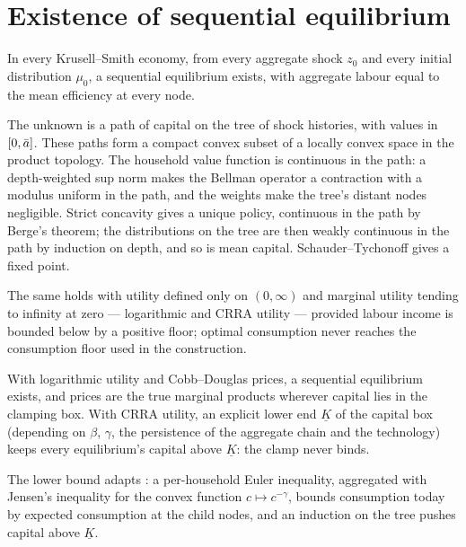 \section{Existence of sequential equilibrium}\label{sec:existence}

\begin{theorem}\label{thm:existence}
In every Krusell--Smith economy, from every aggregate shock $z_0$ and every initial distribution
$\mu_0$, a sequential equilibrium exists, with aggregate labour equal to the mean efficiency at
every node.
\end{theorem}

\noindent
The unknown is a path of capital on the tree of shock histories, with values in $[0,\bar a]$. These
paths form a compact convex subset of a locally convex space in the product topology. The household
value function is continuous in the path: a depth-weighted sup norm makes the Bellman operator a
contraction with a modulus uniform in the path, and the weights make the tree's distant nodes
negligible. Strict concavity gives a unique policy, continuous in the path by Berge's theorem; the
distributions on the tree are then weakly continuous in the path by induction on depth, and so is
mean capital. Schauder--Tychonoff gives a fixed point.

\begin{theorem}\label{thm:existenceInada}
The same holds with utility defined only on $(0,\infty)$ and marginal utility tending to infinity at
zero --- logarithmic and CRRA utility --- provided labour income is bounded below by a positive
floor; optimal consumption never reaches the consumption floor used in the construction.
\end{theorem}

\begin{theorem}\label{thm:existenceCD}
With logarithmic utility and Cobb--Douglas prices, a sequential equilibrium exists, and prices are
the true marginal products wherever capital lies in the clamping box. With CRRA utility, an explicit
lower end $\underline K$ of the capital box (depending on $\beta$, $\gamma$, the persistence of the
aggregate chain and the technology) keeps every equilibrium's capital above $\underline K$: the
clamp never binds.
\end{theorem}

\noindent
The lower bound adapts \citet[Lemma 9]{cao2020}: a per-household Euler inequality, aggregated with
Jensen's inequality for the convex function $c\mapsto c^{-\gamma}$, bounds consumption today by
expected consumption at the child nodes, and an induction on the tree pushes capital above
$\underline K$.

